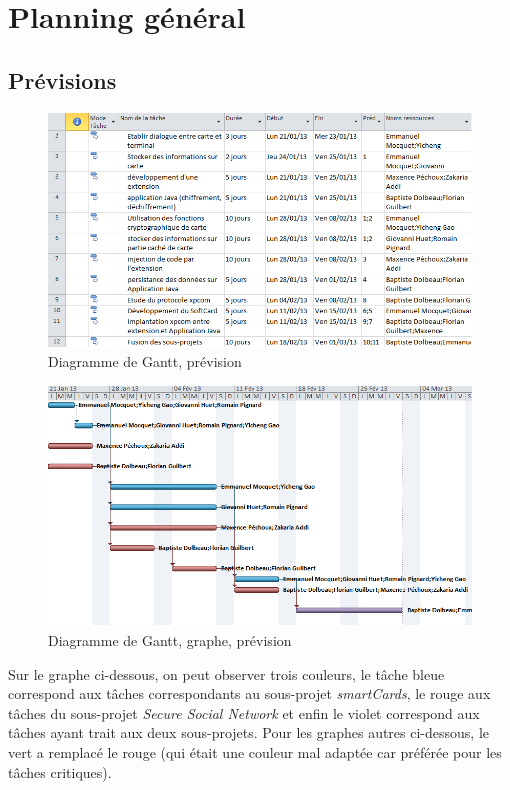 \documentclass[a4paper,11pt,french]{article}
\begin{document}
\section{Planning général}
\subsection{Prévisions}
\begin{center}
\begin{figure}[!h]
\includegraphics[scale=0.70]{ganttArray.png}
\caption{Diagramme de Gantt, prévision}
\end{figure}
\end{center}

\begin{center}
\begin{figure}[!h]
\includegraphics[scale=0.70]{ganttDiag.png}
\caption{Diagramme de Gantt, graphe, prévision}
\end{figure}
\end{center}
Sur le graphe ci-dessous, on peut observer trois couleurs, le tâche bleue correspond
aux tâches correspondants au sous-projet \emph{smartCards}, le rouge aux
tâches du sous-projet \emph{Secure Social Network} et enfin le violet
correspond aux tâches ayant trait aux deux sous-projets. Pour les graphes 
autres ci-dessous, le vert a remplacé le rouge (qui était une couleur mal 
adaptée car préférée pour les tâches critiques).
\end{document}
